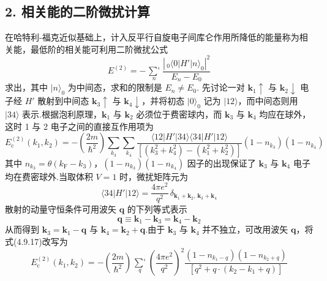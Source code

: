 \subsection*{2. 相关能的二阶微扰计算}

在哈特利-福克近似基础上，计入反平行自旋电子间库仑作用所降低的能量称为相关能，最低阶的相关能可利用二阶微扰公式
\begin{equation}
  E^{(2)}=-\mathop{{\sum}'}\limits_{n}
  \frac{\left|\,{}_{0}\langle 0|H'|n\rangle_{0}\right|^{2}}{E_{n}-E_{0}}
\end{equation}
求出，其中 $|n\rangle_{0}$ 为中间态，求和的限制是 $E_{n}\neq E_{0}$. 先讨论一对 $\boldsymbol{k}_{1}\uparrow$ 与 $\boldsymbol{k}_{2}\downarrow$ 电子经 $H'$ 散射到中间态 $\boldsymbol{k}_{3}\uparrow$ 与 $\boldsymbol{k}_{4}\downarrow$，并将初态 $|0\rangle_{0}$ 记为 $|12\rangle$，而中间态则用 $|34\rangle$ 表示.根据泡利原理，$\boldsymbol{k}_{1}$ 与 $\boldsymbol{k}_{2}$ 必须位于费密球内，而 $\boldsymbol{k}_{3}$ 与 $\boldsymbol{k}_{4}$ 均应在球外，这时 1 与 2 电子之间的直接互作用项为
\begin{equation}
  E_{\mathrm{c}}^{(2)}\left(k_{1},k_{2}\right)
  =-\left(\frac{2m}{\hbar^{2}}\right)\sum_{k_{3}}\sum_{k_{4}}
  \frac{\langle 12|H'|34\rangle\langle 34|H'|12\rangle}
  {\left[\left(k_{3}^{2}+k_{4}^{2}\right)-\left(k_{1}^{2}+k_{2}^{2}\right)\right]}
  \left(1-n_{k_{3}}\right)\left(1-n_{k_{4}}\right)
\end{equation}
其中 $n_{k_{3}}=\theta\left(k_{\mathrm{F}}-k_{3}\right)$，$\left(1-n_{k_{3}}\right)\left(1-n_{k_{4}}\right)$ 因子的出现保证了 $\boldsymbol{k}_{3}$ 与 $\boldsymbol{k}_{4}$ 电子均在费密球外.当取体积 $V=1$ 时，微扰矩阵元为
\begin{equation}
  \langle 34|H'|12\rangle=\frac{4\pi e^{2}}{q^{2}}\,
  \delta_{\boldsymbol{k}_{1}+\boldsymbol{k}_{2},\,\boldsymbol{k}_{3}+\boldsymbol{k}_{4}}
\end{equation}
散射的动量守恒条件可用波矢 $\boldsymbol{q}$ 的下列等式表示
\begin{equation}
  \boldsymbol{q}\equiv\boldsymbol{k}_{1}-\boldsymbol{k}_{3}
  =\boldsymbol{k}_{4}-\boldsymbol{k}_{2}
\end{equation}
从而得到 $\boldsymbol{k}_{3}=\boldsymbol{k}_{1}-\boldsymbol{q}$ 与 $\boldsymbol{k}_{4}=\boldsymbol{k}_{2}+\boldsymbol{q}$.由于 $\boldsymbol{k}_{3}$ 与 $\boldsymbol{k}_{4}$ 并不独立，可改用波矢 $\boldsymbol{q}$，将式(4.9.17)改写为
\begin{equation}
  E_{\mathrm{c}}^{(2)}\left(k_{1},k_{2}\right)
  =-\left(\frac{2m}{\hbar^{2}}\right)\mathop{{\sum}'}\limits_{q}
  \left(\frac{4\pi e^{2}}{q^{2}}\right)^{2}
  \frac{\left(1-n_{k_{1}-q}\right)\left(1-n_{k_{2}+q}\right)}
  {\left[q^{2}+q\cdot\left(k_{2}-k_{1}+q\right)\right]}
\end{equation}
